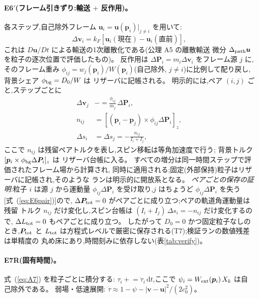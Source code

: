 \documentclass[a4paper,10pt,twocolumn]{ltjsarticle}
\newcommand{\ud}{\mathrm{d}}
\newcommand{\vect}[1]{\bm{#1}}
\newcommand{\Kt}{X_k}
\newcommand{\Dz}{D_0}
\begin{document}
\paragraph*{E6$'$(フレーム引きずり:輸送 $+$ 反作用)。}
各ステップ,自己除外フレーム
$\vect{u}_i = \vect{u}(\vect{p}_i)|_{j \ne i}$ を用いて:
\begin{equation}
\Delta\vect{v}_i = k_F\left[\vect{u}_i(\text{現在})
 - \vect{u}_i(\text{直前})\right],
\label{eq:E6}
\end{equation}
これは $D\vect{u}/Dt$ による輸送の1次離散化である(公理 A5 の離散輸送
微分 $\Delta_{\rm path}\vect{u}$ を粒子の逐次位置で評価したもの)。
反作用は $\Delta\vect{P}_i = m_i\Delta\vect{v}_i$ をフレーム源 $j$ に,
そのフレーム重み $\phi_{ij} = w_j(\vect{p}_i)/W(\vect{p}_i)$(自己除外,
$j \ne i$)に比例して配り戻し,背景シェア $\phi_{\rm bg} = \Dz/W$ は
リザーバに記帳される。
明示的には,ペア $(i,j)$ ごと,ステップごとに
\begin{align}
\Delta\vect{v}_j &\mathrel{-}= \frac{\phi_{ij}}{m_j}\,
 \Delta\vect{P}_i,\nonumber\\
n_{ij} &= \left[(\vect{p}_i-\vect{p}_j)\times
 \phi_{ij}\Delta\vect{P}_i\right]_z,\nonumber\\
\Delta s_i &= \Delta s_j = -\frac{n_{ij}}{I_i+I_j},
\label{eq:E6pair}
\end{align}
ここで $n_{ij}$ は残留ペアトルクを表し,スピン移転は等角加速度で行う;
背景トルク $[\vect{p}_i \times \phi_{\rm bg}\Delta\vect{P}_i]_z$ は
リザーバ台帳に入る。
すべての増分は同一時間ステップで評価されたフレーム場から計算され,
同時に適用される;固定(外部保持)粒子はリザーバに記帳され,そのような
ランは明示的に開放系となる。
\emph{ペアごとの保存の証明:}粒子 $i$ は源 $j$ から運動量
$\phi_{ij}\Delta\vect{P}_i$ を受け取り,$j$ はちょうど
$\phi_{ij}\Delta\vect{P}_i$ を失う[式~(\ref{eq:E6pair})]ので,
$\Delta\vect{P}_{\rm tot} = 0$ がペアごとに成り立つ;ペアの軌道角運動量は残留
トルク $n_{ij}$ だけ変化し,スピン台帳は
$(I_i+I_j)\,\Delta s_i = -n_{ij}$ だけ変化するので,
$\Delta L_{\rm tot} = 0$ もペアごとに成り立つ。
したがって $\Dz = 0$ かつ固定粒子なしのとき,$\vect{P}_{\rm tot}$ と $L_{\rm tot}$
は方程式レベルで厳密に保存される(T7);検証ランの数値残差は単精度の
丸め床にあり,時間刻みに依存しない(表\ref{tab:verify})。

\paragraph*{E7R(固有時間)。}
式~(\ref{eq:A7}) を粒子ごとに積分する:
$\tau_i \mathrel{+}= \dot\tau_i\,\ud t$,ここで
$\psi_i = W_{\rm ext}(\vect{p}_i)\,\Kt$ は自己除外である。
弱場・低速展開:
$\dot\tau \approx 1 - \psi - |\vect{v}-\vect{u}|^2/(2c_0^2)$。
\end{document}
